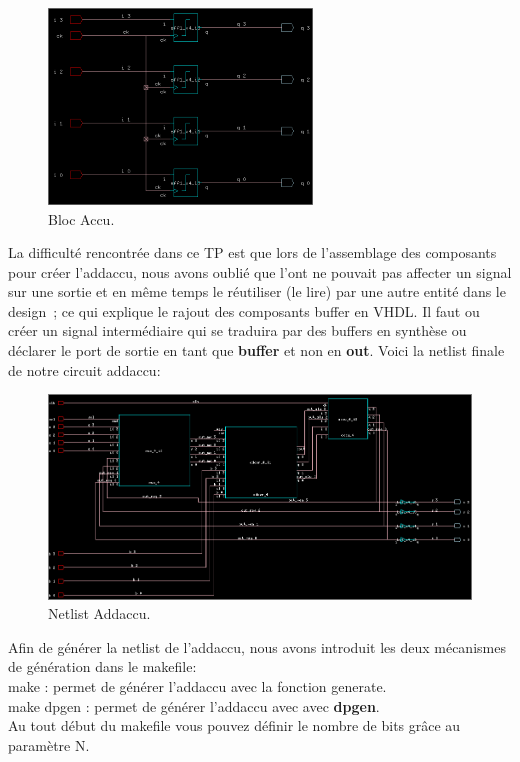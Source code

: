 \documentclass[12pt]{article}
\begin{document}
\begin{figure}
\begin{center}
  \includegraphics[width = 7cm]{pic/accu.png}
\end{center}
\caption{Bloc Accu.}
\end{figure}
La difficulté rencontrée dans ce TP est que lors de l'assemblage des composants pour créer l'addaccu, nous avons oublié que l'ont ne pouvait pas affecter un signal sur une sortie et en même temps le réutiliser (le lire) par une autre entité dans le design ; ce qui explique le rajout des composants buffer en VHDL. Il faut ou créer un signal intermédiaire qui se traduira par des buffers en synthèse ou  déclarer le port de sortie en tant que \textbf{buffer} et non en \textbf{out}.
Voici la netlist finale de notre circuit addaccu:
\begin{figure}
\begin{center}
  \includegraphics[width = 12cm]{pic/addaccu.png}
\end{center}
\caption{Netlist Addaccu.}
\end{figure}
Afin de générer la netlist de l'addaccu, nous avons introduit les deux mécanismes de génération dans le makefile:\\
make : permet de générer l'addaccu avec la fonction generate.\\
make dpgen : permet de générer l'addaccu avec avec \textbf{dpgen}.\\
Au tout début du makefile vous pouvez définir le nombre de bits grâce au paramètre N.\\
\end{document}
